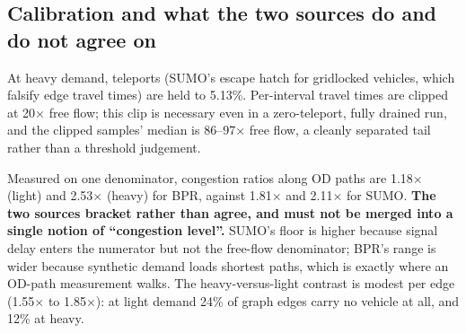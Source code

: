 \subsection{Calibration and what the two sources do and do not agree on}

At heavy demand, teleports (SUMO's escape hatch for gridlocked vehicles,
which falsify edge travel times) are held to 5.13\%. Per-interval travel
times are clipped at 20$\times$ free flow; this clip is necessary even in a
zero-teleport, fully drained run, and the clipped samples' median is
86--97$\times$ free flow, a cleanly separated tail rather than a threshold
judgement.

Measured on one denominator, congestion ratios along OD paths are
1.18$\times$ (light) and 2.53$\times$ (heavy) for BPR, against 1.81$\times$
and 2.11$\times$ for SUMO. \textbf{The two sources bracket rather than agree,
and must not be merged into a single notion of ``congestion level''.} SUMO's
floor is higher because signal delay enters the numerator but not the
free-flow denominator; BPR's range is wider because synthetic demand loads
shortest paths, which is exactly where an OD-path measurement walks. The
heavy-versus-light contrast is modest per edge (1.55$\times$ to
1.85$\times$): at light demand 24\% of graph edges carry no vehicle at all,
and 12\% at heavy.
